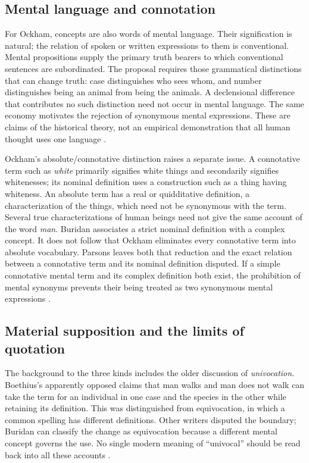 \subsection{Mental language and connotation}
\label{sec:p13-supposition-mental}

For Ockham, concepts are also words of mental language. Their
signification is natural; the relation of spoken or written expressions
to them is conventional. Mental propositions supply the primary truth
bearers to which conventional sentences are subordinated. The proposal
requires those grammatical distinctions that can change truth: case
distinguishes who sees whom, and number distinguishes being an animal
from being the animals. A declensional difference that contributes no
such distinction need not occur in mental language. The same economy
motivates the rejection of synonymous mental expressions. These are
claims of the historical theory, not an empirical demonstration that all
human thought uses one language
\cite[pp.~189--190]{Parsons2007FordhamSupposition}.

Ockham's absolute/connotative distinction raises a separate issue. A
connotative term such as \emph{white} primarily signifies white things
and secondarily signifies whitenesses; its nominal definition uses a
construction such as a thing having whiteness. An absolute term has a
real or quidditative definition, a characterization of the things, which
need not be synonymous with the term. Several true characterizations of
human beings need not give the same account of the word \emph{man}.
Buridan associates a strict nominal definition with a complex concept.
It does not follow that Ockham eliminates every connotative term into
absolute vocabulary. Parsons leaves both that reduction and the exact
relation between a connotative term and its nominal definition disputed.
If a simple connotative mental term and its complex definition both
exist, the prohibition of mental synonyms prevents their being treated
as two synonymous mental expressions
\cite[pp.~190--192]{Parsons2007FordhamSupposition}.

\subsection{Material supposition and the limits of quotation}
\label{sec:p13-supposition-material}

The background to the three kinds includes the older discussion of
\emph{univocation}. Boethius's apparently opposed claims that man walks
and man does not walk can take the term for an individual in one case
and the species in the other while retaining its definition. This was
distinguished from equivocation, in which a common spelling has different
definitions. Other writers disputed the boundary; Buridan can classify
the change as equivocation because a different mental concept governs
the use. No single modern meaning of ``univocal'' should be read back
into all these accounts
\cite[pp.~192--193]{Parsons2007FordhamSupposition}.

